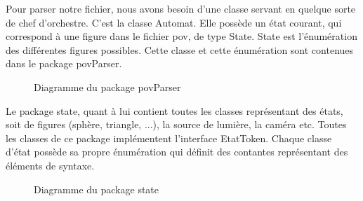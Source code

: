 \documentclass[../../Rapport RayTracer.tex]{subfiles}
\begin{document}
Pour parser notre fichier, nous avons besoin d'une classe servant en quelque sorte de chef d'orchestre. C'est la classe Automat. Elle possède un état courant, qui correspond à une figure dans le fichier pov, de type State. State est l'énumération des différentes figures possibles. Cette classe et cette énumération sont contenues dans le package povParser.


\begin{figure}[h!]
	\caption{Diagramme du package povParser}
	\label{diagrammePackagPovParser}
\end{figure}
\FloatBarrier

Le package state, quant à lui contient toutes les classes représentant des états, soit de figures (sphère, triangle, ...), la source de lumière, la caméra etc. Toutes les classes de ce package implémentent l'interface EtatToken. Chaque classe d'état possède sa propre énumération qui définit des contantes représentant des éléments de syntaxe. 

\begin{figure}[h!]
	\caption{Diagramme du package state}
	\label{diagrammePackagPovParser}
\end{figure}
\FloatBarrier
\end{document}
